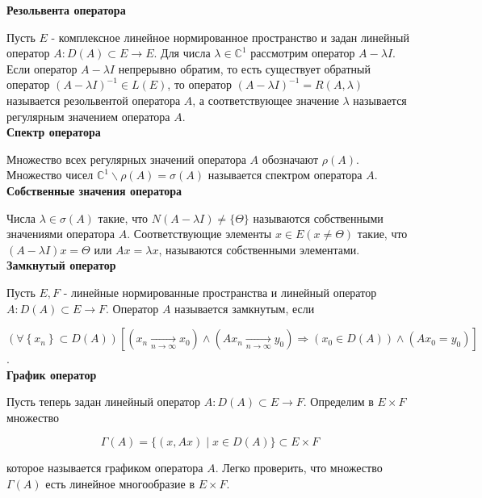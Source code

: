 \textbf{Резольвента оператора}

Пусть $E$ - комплексное линейное нормированное пространство и задан линейный оператор $A: D(A) \subset E \rightarrow E$. Для числа $\lambda \in \mathbb{C}^{1}$ рассмотрим оператор $A-\lambda I$. Если оператор $A-\lambda I$ непрерывно обратим, то есть существует обратный оператор $(A-\lambda I)^{-1} \in L(E)$, то оператор $(A-\lambda I)^{-1}=R(A, \lambda)$ называется резольвентой оператора $A$, а соответствующее значение $\lambda$ называется регулярным значением оператора $A$.\\

\textbf{Спектр оператора}

Множество всех регулярных значений оператора $A$ обозначают $\rho(A)$. Множество чисел $\mathbb{C}^{1} \backslash \rho(A)=\sigma(A)$ называется спектром оператора $A$.\\

\textbf{Собственные значения оператора}

Числа $\lambda \in \sigma(A)$ такие, что $N(A-\lambda I) \neq\{\Theta\}$ называются собственными значениями оператора $A$. Соответствующие элементы $x \in E(x \neq \Theta)$ такие, что $(A-\lambda I) x=\Theta$ или $A x=\lambda x$, называются собственными элементами.\\

\textbf{Замкнутый оператор}

Пусть $E, F$ - линейные нормированные пространства и линейный оператор $A: D(A) \subset E \rightarrow F$. Оператор $A$ называется замкнутым, если 

$\left(\forall\left\{x_{n}\right\} \subset D(A)\right)\left[\left(x_{n} \underset{n \rightarrow \infty}{\longrightarrow} x_{0}\right) \wedge\left(A x_{n} \underset{n \rightarrow \infty}{\longrightarrow} y_{0}\right) \Rightarrow\left(x_{0} \in D(A)\right) \wedge\left(A x_{0}=y_{0}\right)\right]$.\\

\textbf{График оператор}

Пусть теперь задан линейный оператор $A: D(A) \subset E \rightarrow F$. Определим в $E \times F$ множество

\[
\Gamma(A)=\{(x, A x) \mid x \in D(A)\} \subset E \times F
\]

которое называется графиком оператора $A$. Легко проверить, что множество $\Gamma(A)$ есть линейное многообразие в $E \times F$.



